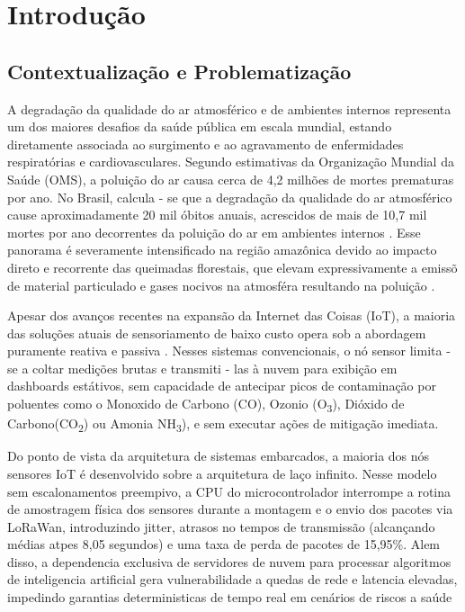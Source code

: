 \chapter{Introdução}
\section{Contextualização e Problematização}
A degradação da qualidade do ar atmosférico e de ambientes 
internos representa um dos maiores desafios da saúde pública em
escala mundial, estando diretamente associada ao surgimento e ao 
agravamento de enfermidades respiratórias e cardiovasculares.
Segundo estimativas da Organização Mundial da Saúde (OMS), a poluição do ar causa
cerca de 4,2 milhões de mortes prematuras por ano. No Brasil, calcula - se
que a degradação da qualidade do ar atmosférico cause aproximadamente 20 mil óbitos
anuais, acrescidos de mais de 10,7 mil mortes por ano decorrentes da poluição do ar
em ambientes internos \cite{cunha2024}. Esse panorama é severamente intensificado
na região amazônica devido ao impacto direto e recorrente das queimadas florestais,
que elevam expressivamente a emissõ de material particulado e gases nocivos na
atmosféra resultando na poluição \cite{gomes2024}.


Apesar dos avanços recentes na expansão da Internet das Coisas (IoT), a maioria
das soluções atuais de sensoriamento de baixo custo opera sob a abordagem puramente reativa 
e passiva \cite{cunha2024}. Nesses sistemas convencionais, o nó sensor limita - se a coltar
medições brutas e transmiti - las à nuvem para exibição em dashboards estátivos, sem capacidade
de antecipar picos de contaminação por poluentes como o Monoxido de Carbono (CO),
Ozonio (O\textsubscript{3}), Dióxido de Carbono(CO\textsubscript{2}) ou Amonia NH\textsubscript{3}), e 
sem executar ações de mitigação imediata. \cite{cunha2024}

Do ponto de vista da arquitetura de sistemas embarcados, a maioria dos nós sensores IoT
é desenvolvido sobre a arquitetura de laço infinito. Nesse modelo
sem escalonamentos preempivo, a CPU do microcontrolador interrompe a rotina de amostragem
física dos sensores durante a montagem e o envio dos pacotes via LoRaWan, introduzindo
jitter, atrasos no tempos de transmissão (alcançando médias atpes 8,05 segundos) e uma taxa
de perda de pacotes de 15,95\%. Alem disso, a dependencia exclusiva de servidores
de nuvem para processar algoritmos de inteligencia artificial gera vulnerabilidade a quedas 
de rede e latencia elevadas, impedindo garantias deterministicas de tempo real em cenários
de riscos a saúde \cite{alves2025freertos}

